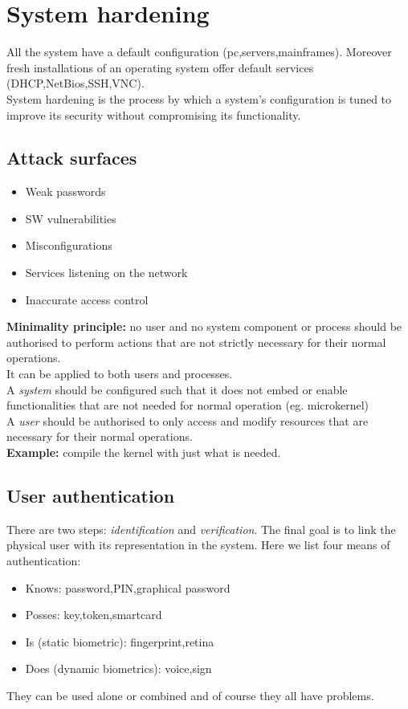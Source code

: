 \documentclass[10pt,a4paper]{book}
\begin{document}
\chapter{System hardening}
All the system have a default configuration (pc,servers,mainframes). Moreover fresh installations of an operating system offer default services (DHCP,NetBios,SSH,VNC).\\
System hardening is the process by which a system's configuration is tuned to improve its security without compromising its functionality.
\section{Attack surfaces}
\begin{itemize}[noitemsep]
\item Weak passwords
\item SW vulnerabilities
\item Misconfigurations
\item Services listening on the network
\item Inaccurate access control
\end{itemize}
\textbf{Minimality principle:} no user and no system component or process should be authorised to perform actions that are not strictly necessary for their normal operations.\\
It can be applied to both users and processes.\\
A \emph{system} should be configured such that it does not embed or enable functionalities that are not needed for normal operation (eg. microkernel)\\
A \emph{user} should be authorised to only access and modify resources that are necessary for their normal operations.\\
\textbf{Example:} compile the kernel with just what is needed.
\section{User authentication}
There are two steps: \emph{identification} and \emph{verification}. The final goal is to link the physical user with its representation in the system. Here we list four means of authentication:
\begin{itemize}[noitemsep,nolistsep]
\item Knows: password,PIN,graphical password
\item Posses: key,token,smartcard
\item Is (static biometric): fingerprint,retina
\item Does (dynamic biometrics): voice,sign
\end{itemize}
They can be used alone or combined and of course they all have problems.
\end{document}
